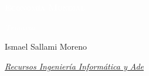 \documentclass[12pt]{book} %
\begin{document}
\begin{titlepage}
\begin{center}
        \vspace{5cm} %
        {\Huge \bfseries\scshape\textcolor{white}{Economía
Mundial} \par}
        \vspace{0.5cm}
        {\Large \itshape\textcolor{white}{Temario} \par}
        \vspace{0.5cm}


        \vfill
        

        \begin{flushright}
            {Ismael Sallami Moreno \par}
            {\small \itshape \href{https://elblogdeismael.github.io}{Recursos Ingeniería Informática y Ade} \par}
        \end{flushright}
        \vspace{0.3cm}
        
        
    \end{center}
    
    \restoregeometry
\end{titlepage}


\end{document}
